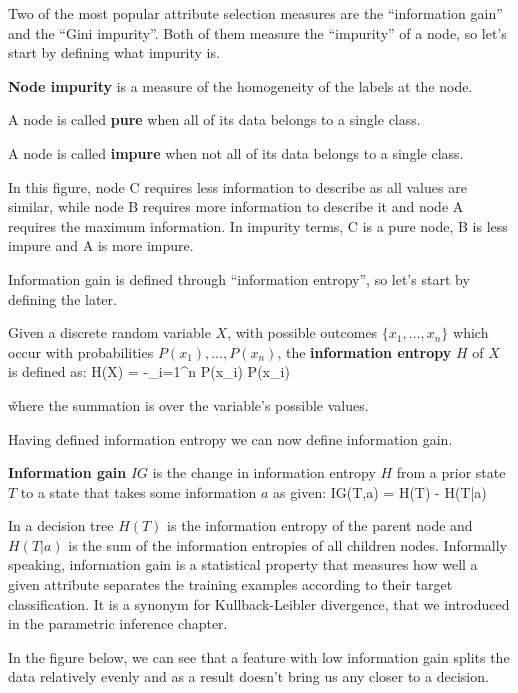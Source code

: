 Two of the most popular attribute selection measures are the ``information gain'' and the ``Gini impurity''. Both of
them measure the ``impurity'' of a node, so let's start by defining what impurity is.

\textbf{Node impurity} is a measure of the homogeneity of the labels at the node.
\ed

A node is called \textbf{pure} when all of its data belongs to a single class.
\ed

A node is called \textbf{impure} when not all of its data belongs to a single class.
\ed

\be
In this figure, node C requires less information to describe as all values are similar, while node B requires more
information to describe it and node A requires the maximum information. In impurity terms, C is a pure node, B is less
impure and A is more impure.

\ee

Information gain is defined through ``information entropy'', so let's start by defining the later.

Given a discrete random variable $X$, with possible outcomes $\{x_{1}, \ldots, x_{n} \}$ which occur with probabilities
$P(x_{1}), \ldots, P (x_{n})$, the \textbf{information entropy} $H$ of $X$ is defined as:
\bse
H(X) = -\sum _{i=1}^{n} {P(x_{i}) \log P(x_{i})}
\ese

\v

where the summation is over the variable's possible values.
\ed

Having defined information entropy we can now define information gain.

\textbf{Information gain} $IG$ is the change in information entropy $H$ from a prior state $T$ to a state that takes
some information $a$ as given:
\bse
IG(T,a) = H(T) - H(T|a)
\ese
\ed

In a decision tree $H(T)$ is the information entropy of the parent node and $H(T|a)$ is the sum of the information
entropies of all children nodes. Informally speaking, information gain is a statistical property that measures how
well a given attribute separates the training examples according to their target classification. It is a synonym for
Kullback-Leibler divergence, that we introduced in the parametric inference chapter.

\be
In the figure below, we can see that a feature with low information gain splits the data relatively evenly and as a
result doesn't bring us any closer to a decision.

